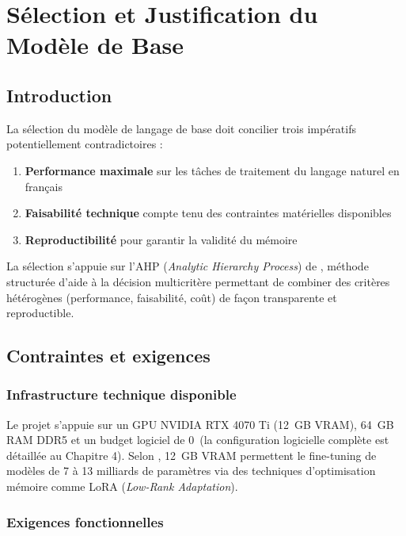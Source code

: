 
\chapter{Sélection et Justification du Modèle de Base}

\section{Introduction}

La sélection du modèle de langage de base doit concilier trois impératifs potentiellement contradictoires :

\begin{enumerate}
    \item \textbf{Performance maximale} sur les tâches de traitement du langage naturel en français
    
    \item \textbf{Faisabilité technique} compte tenu des contraintes matérielles disponibles
    
    \item \textbf{Reproductibilité} pour garantir la validité du mémoire
\end{enumerate}

La sélection s'appuie sur l'AHP (\textit{Analytic Hierarchy Process}) de \citet{saaty1980ahp}, méthode structurée d'aide à la décision multicritère permettant de combiner des critères hétérogènes (performance, faisabilité, coût) de façon transparente et reproductible.

\section{Contraintes et exigences}

\subsection{Infrastructure technique disponible}

Le projet s'appuie sur un GPU NVIDIA RTX 4070 Ti (12~GB VRAM), 64~GB RAM DDR5 et un budget logiciel de 0\,\texteuro{} (la configuration logicielle complète est détaillée au Chapitre 4). Selon \citet{dettmers2023qlora}, 12~GB VRAM permettent le fine-tuning de modèles de 7 à 13 milliards de paramètres via des techniques d'optimisation mémoire comme LoRA (\textit{Low-Rank Adaptation}).

\subsection{Exigences fonctionnelles}

